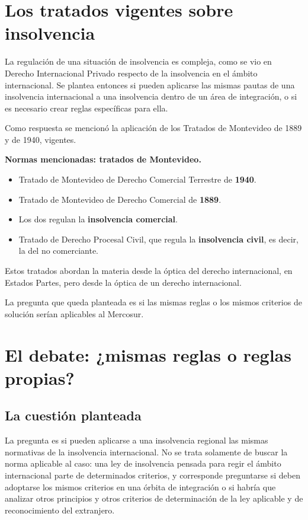 \documentclass[12pt,oneside]{book}
\begin{document}
\section{Los tratados vigentes sobre insolvencia}

La regulación de una situación de insolvencia es compleja, como se vio en Derecho Internacional Privado respecto de la insolvencia en el ámbito internacional. Se plantea entonces si pueden aplicarse las mismas pautas de una insolvencia internacional a una insolvencia dentro de un área de integración, o si es necesario crear reglas específicas para ella.

Como respuesta se mencionó la aplicación de los Tratados de Montevideo de 1889 y de 1940, vigentes.

\begin{note}
\textbf{Normas mencionadas: tratados de Montevideo.}
\begin{itemize}
    \item Tratado de Montevideo de Derecho Comercial Terrestre de \textbf{1940}.
    \item Tratado de Montevideo de Derecho Comercial de \textbf{1889}.
    \item Los dos regulan la \textbf{insolvencia comercial}.
    \item Tratado de Derecho Procesal Civil, que regula la \textbf{insolvencia civil}, es decir, la del no comerciante.
\end{itemize}
Estos tratados abordan la materia desde la óptica del derecho internacional, en Estados Partes, pero desde la óptica de un derecho internacional.
\end{note}

La pregunta que queda planteada es si las mismas reglas o los mismos criterios de solución serían aplicables al Mercosur.

\section{El debate: ¿mismas reglas o reglas propias?}

\subsection{La cuestión planteada}

La pregunta es si pueden aplicarse a una insolvencia regional las mismas normativas de la insolvencia internacional. No se trata solamente de buscar la norma aplicable al caso: una ley de insolvencia pensada para regir el ámbito internacional parte de determinados criterios, y corresponde preguntarse si deben adoptarse los mismos criterios en una órbita de integración o si habría que analizar otros principios y otros criterios de determinación de la ley aplicable y de reconocimiento del extranjero.
\end{document}
